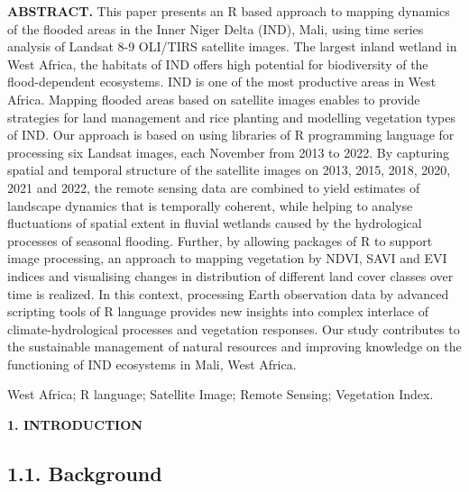 \documentclass[12pt,a4paper,oneside]{article}
\def \newsection{\vspace{12pt}\textbf}
\def \newpar{\vspace{6pt}}
\begin{document}
{\bf ABSTRACT.} This paper presents an R based approach to mapping dynamics of the flooded areas in the Inner Niger Delta (IND), Mali, using time series analysis of Landsat 8-9 OLI/TIRS satellite images. The largest inland wetland in West Africa, the habitats of IND offers high potential for biodiversity of the flood-dependent ecosystems. IND is one of the most productive areas in West Africa. Mapping flooded areas based on satellite images enables to provide strategies for land management and rice planting and modelling vegetation types of IND. Our approach is based on using libraries of R programming language for processing six Landsat images, each November from 2013 to 2022. By capturing spatial and temporal structure of the satellite images on 2013, 2015, 2018, 2020, 2021 and 2022, the remote sensing data are combined to yield estimates of landscape dynamics that is temporally coherent, while helping to analyse fluctuations of spatial extent in fluvial wetlands caused by the hydrological processes of seasonal flooding. Further, by allowing packages of R to support image processing, an approach to mapping vegetation by NDVI, SAVI and EVI indices and visualising changes in distribution of different land cover classes over time is realized. In this context, processing Earth observation data by advanced scripting tools of R language provides new insights into complex interlace of climate-hydrological processes and vegetation responses. Our study contributes to the sustainable management of natural resources and improving knowledge on the functioning of IND ecosystems in Mali, West Africa. 

\newpar {\bf Keywords:} West Africa; R language; Satellite Image; Remote Sensing; Vegetation Index.


\newsection {1. INTRODUCTION}

\subsection*{1.1. Background}
\end{document}
